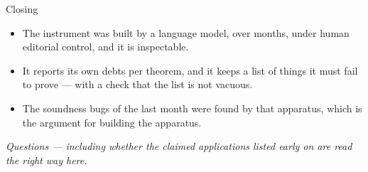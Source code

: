 \documentclass[11pt,aspectratio=169]{beamer}
\begin{document}
\begin{frame}{Closing}
  \begin{itemize}
    \item The instrument was built by a language model, over months, under
          human editorial control, and it is inspectable.
    \item It reports its own debts per theorem, and it keeps a list of things
          it must fail to prove --- with a check that the list is not vacuous.
    \item The soundness bugs of the last month were found by that apparatus,
          which is the argument for building the apparatus.
  \end{itemize}
  \vfill
  \begin{center}
    \emph{Questions --- including whether the claimed applications listed
    early on are read the right way here.}
  \end{center}
\end{frame}
\end{document}
